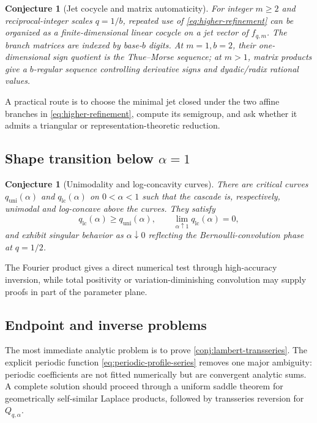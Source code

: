 \documentclass[11pt]{article}
\newtheorem{conjecture}[theorem]{Conjecture}
\theoremstyle{definition}
\theoremstyle{remark}
\begin{document}
\begin{conjecture}[Jet cocycle and matrix automaticity]
\label{conj:matrix-thue-morse}
For integer \(m\ge2\) and reciprocal-integer scales \(q=1/b\), repeated use of
\eqref{eq:higher-refinement} can be organized as a finite-dimensional linear
cocycle on a jet vector of \(f_{q,m}\).  The branch matrices are indexed by
base-\(b\) digits.  At \(m=1,b=2\), their one-dimensional sign quotient is the
Thue--Morse sequence; at \(m>1\), matrix products give a \(b\)-regular
sequence controlling derivative signs and dyadic/radix rational values.
\end{conjecture}

A practical route is to choose the minimal jet closed under the two affine
branches in \eqref{eq:higher-refinement}, compute its semigroup, and ask
whether it admits a triangular or representation-theoretic reduction.

\subsection{Shape transition below \(\alpha=1\)}

\begin{conjecture}[Unimodality and log-concavity curves]
\label{conj:shape-curve}
There are critical curves \(q_{\mathrm{uni}}(\alpha)\) and
\(q_{\mathrm{lc}}(\alpha)\) on \(0<\alpha<1\) such that the cascade is,
respectively, unimodal and log-concave above the curves.  They satisfy
\[
 q_{\mathrm{lc}}(\alpha)\ge q_{\mathrm{uni}}(\alpha),
 \qquad
 \lim_{\alpha\uparrow1}q_{\mathrm{lc}}(\alpha)=0,
\]
and exhibit singular behavior as \(\alpha\downarrow0\) reflecting the
Bernoulli-convolution phase at \(q=1/2\).
\end{conjecture}

The Fourier product gives a direct numerical test through high-accuracy
inversion, while total positivity or variation-diminishing convolution may
supply proofs in part of the parameter plane.

\subsection{Endpoint and inverse problems}

The most immediate analytic problem is to prove
\cref{conj:lambert-transseries}.  The explicit periodic function
\eqref{eq:periodic-profile-series} removes one major ambiguity: periodic
coefficients are not fitted numerically but are convergent analytic sums.  A
complete solution should proceed through a uniform saddle theorem for
geometrically self-similar Laplace products, followed by transseries reversion
for \(Q_{q,\alpha}\).
\end{document}
